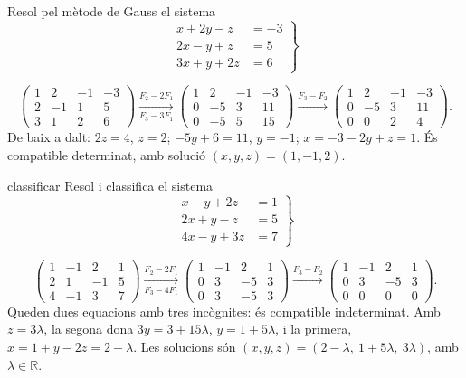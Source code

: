 \begin{apartats}

Resol pel mètode de Gauss el sistema
\[
\left.\begin{aligned}
x+2y-z&=-3\\
2x-y+z&=5\\
3x+y+2z&=6
\end{aligned}\right\}
\]

\begin{solucio}
\[
\left(\begin{array}{ccc|c}1&2&-1&-3\\2&-1&1&5\\3&1&2&6\end{array}\right)
\xrightarrow[F_3-3F_1]{F_2-2F_1}
\left(\begin{array}{ccc|c}1&2&-1&-3\\0&-5&3&11\\0&-5&5&15\end{array}\right)
\xrightarrow{F_3-F_2}
\left(\begin{array}{ccc|c}1&2&-1&-3\\0&-5&3&11\\0&0&2&4\end{array}\right).
\]
De baix a dalt: $2z=4$, $z=2$; $-5y+6=11$, $y=-1$; $x=-3-2y+z=1$. És compatible determinat, amb
solució $(x,y,z)=(1,-1,2)$.
\end{solucio}

\begin{tria}{classificar}
Resol i classifica el sistema
\[
\left.\begin{aligned}
x-y+2z&=1\\
2x+y-z&=5\\
4x-y+3z&=7
\end{aligned}\right\}
\]

\begin{solucio}
\[
\left(\begin{array}{ccc|c}1&-1&2&1\\2&1&-1&5\\4&-1&3&7\end{array}\right)
\xrightarrow[F_3-4F_1]{F_2-2F_1}
\left(\begin{array}{ccc|c}1&-1&2&1\\0&3&-5&3\\0&3&-5&3\end{array}\right)
\xrightarrow{F_3-F_2}
\left(\begin{array}{ccc|c}1&-1&2&1\\0&3&-5&3\\0&0&0&0\end{array}\right).
\]
Queden dues equacions amb tres incògnites: és compatible indeterminat. Amb $z=3\lambda$, la segona dona
$3y=3+15\lambda$, $y=1+5\lambda$, i la primera, $x=1+y-2z=2-\lambda$. Les solucions són
$(x,y,z)=(2-\lambda,\ 1+5\lambda,\ 3\lambda)$, amb $\lambda\in\mathbb R$.
\end{solucio}


\end{tria}
\end{apartats}
